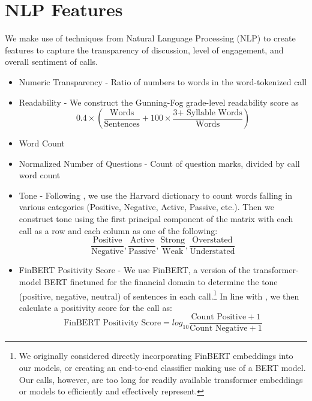 \documentclass{article}[11pt]
\begin{document}
    \section*{NLP Features}

    We make use of techniques from Natural Language Processing (NLP) to create features to capture the transparency of discussion, level of engagement, and overall sentiment of calls.

    \begin{itemize}
        \item Numeric Transparency - Ratio of numbers to words in the word-tokenized call
        \item Readability - We construct the Gunning-Fog grade-level readability score \citep{gunning_technique_1952} as 
        \begin{equation*}
            0.4 \times (\frac{\text{Words}}{\text{Sentences}} + 100 \times \frac{\text{3+ Syllable Words}}{\text{Words}})
        \end{equation*}
        \item Word Count
        \item Normalized Number of Questions - Count of question marks, divided by call word count
        \item Tone - Following \cite{price_earnings_2012}, we use the Harvard dictionary to count words falling in various categories (Positive, Negative, Active, Passive, etc.). Then we construct tone using the first principal component of the matrix with each call as a row and each column as one of the following:
        \begin{equation*}
            \frac{\text{Positive}}{\text{Negative}}, \frac{\text{Active}}{\text{Passive}}, \frac{\text{Strong}}{\text{Weak}}, \frac{\text{Overstated}}{\text{Understated}}
        \end{equation*}
        \item FinBERT Positivity Score - We use FinBERT, a version of the transformer-model BERT finetuned for the financial domain to determine the tone (positive, negative, neutral) of sentences in each call.\footnote{We originally considered directly incorporating FinBERT embeddings into our models, or creating an end-to-end classifier making use of a BERT model. Our calls, however, are too long for readily available transformer embeddings or models to efficiently and effectively represent.} \citep{huang_finbert_2023} In line with \cite{kantos_comparative_2022}, we then calculate a positivity score for the call as:
        \begin{equation*}
            \text{FinBERT Positivity Score} = log_{10}\frac{\text{Count Positive} + 1}{\text{Count Negative} + 1}
        \end{equation*}
    \end{itemize}
\end{document}
